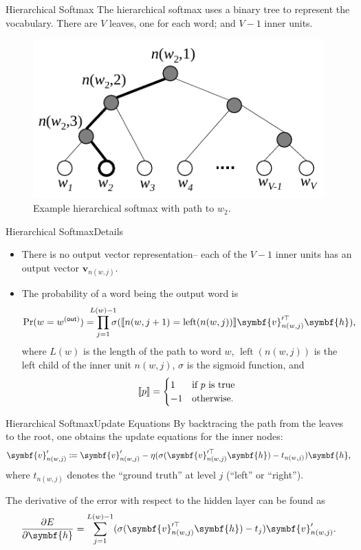 \documentclass[usepdftitle=false]{beamer}
\theoremstyle{definition}
\renewcommand*{\vec}{\symbf}%
\newcommand*{\trans}{\top}%
\DeclarePairedDelimiter{\Iverson}{\llbracket}{\rrbracket}%
\newcommand*{\outs}{\mathsf{(out)}}
\DeclareMathOperator{\Left}{left}
\begin{document}
\begin{frame}{Hierarchical Softmax}
  The hierarchical softmax uses a binary tree to represent the
  vocabulary.  There are \(V\) leaves, one for each word; and
  \(V - 1\) inner units.
  \begin{figure}
    \centering
    \includegraphics[width=.5\textwidth]{Hierarchical_Softmax.pdf}
    \caption{Example hierarchical softmax with path to \(w_2\).}
  \end{figure}  
\end{frame}

\begin{frame}{Hierarchical Softmax}{Details}
  \begin{itemize}
  \item There is no output vector representation\--- each of the
    \(V - 1\) inner units has an output vector \(\vec{v}_{n(w, j)}\).
  \item The probability of a word being the output word is
    \[
      \Pr(w = w^{\outs}) = \prod_{j = 1}^{\mathclap{L(w) - 1}}
      \sigma(\Iverson{n(w, j + 1) = \Left(n(w, j))}
      \vec{v}^{\prime\trans}_{n(w, j)} \vec{h})\text,
    \]
    where \(L(w)\) is the length of the path to word \(w\),
    \(\Left(n(w, j))\) is the left child of the inner unit
    \(n(w, j)\), \(\sigma\) is the sigmoid function, and
    \[
      \Iverson{p} =
      \begin{cases}
        1 & \text{if}\ p\ \text{is true}\\
        -1 & \text{otherwise.}
      \end{cases}
    \]
  \end{itemize}
\end{frame}

\begin{frame}{Hierarchical Softmax}{Update Equations}
  By backtracing the path from the leaves to the root, one obtains the
  update equations for the inner nodes:
  \[
    \vec{v}'_{n(w, j)} \coloneqq
    \vec{v}'_{n(w, j)} - \eta
    (\sigma(\vec{v}^{\prime\trans}_{n(w, j)} \vec{h}) - t_{n(w, j)})
    \vec{h}\text,
  \]
  where \(t_{n(w, j)}\) denotes the \enquote{ground truth} at level
  \(j\) (\enquote{left} or \enquote{right}).

  The derivative of the error with respect to the hidden layer can be
  found as
  \[
    \frac{\partial E}{\partial \vec{h}} = \sum_{j = 1}^{L(w) - 1}
    (\sigma(\vec{v}^{\prime\trans}_{n(w, j)} \vec{h}) - t_j)
    \vec{v}'_{n(w, j)}\text.
  \]
\end{frame}
\end{document}
